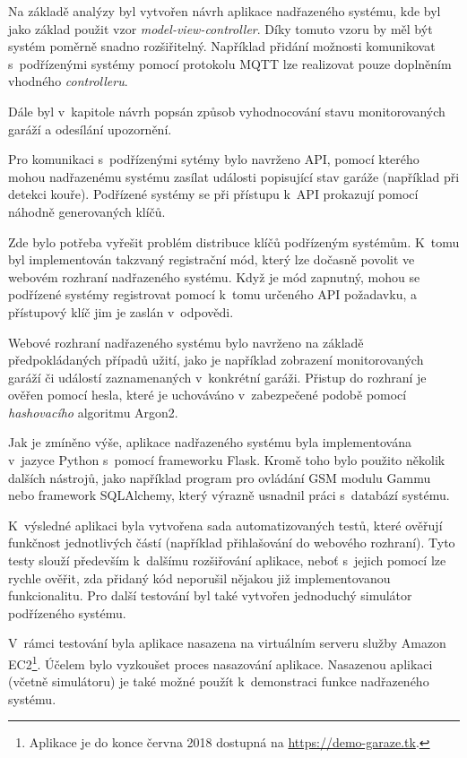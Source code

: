 Na základě analýzy byl vytvořen návrh aplikace nadřazeného systému, kde byl jako základ použit vzor \textit{model-view-controller}. Díky tomuto vzoru by měl být systém poměrně snadno rozšiřitelný. Například přidání možnosti komunikovat s~podřízenými systémy pomocí protokolu MQTT lze realizovat pouze doplněním vhodného \textit{controlleru}.

Dále byl v~kapitole návrh popsán způsob vyhodnocování stavu monitorovaných garáží a odesílání upozornění.

Pro komunikaci s~podřízenými sytémy bylo navrženo API, pomocí kterého mohou nadřazenému systému zasílat události popisující stav garáže (například při detekci kouře). Podřízené systémy se při přístupu k~API prokazují pomocí náhodně generovaných klíčů.

Zde bylo potřeba vyřešit problém distribuce klíčů podřízeným systémům. K~tomu byl implementován takzvaný registrační mód, který lze dočasně povolit ve webovém rozhraní nadřazeného systému. Když je mód zapnutný, mohou se podřízené systémy registrovat pomocí k~tomu určeného API požadavku, a přístupový klíč jim je zaslán v~odpovědi.

Webové rozhraní nadřazeného systému bylo navrženo na základě předpokládaných případů užití, jako je například zobrazení monitorovaných garáží či událostí zaznamenaných v~konkrétní garáži. Přistup do rozhraní je ověřen pomocí hesla, které je uchováváno v~zabezpečené podobě pomocí \textit{hashovacího} algoritmu Argon2.

Jak je zmíněno výše, aplikace nadřazeného systému byla implementována v~jazyce Python s~pomocí frameworku Flask. Kromě toho bylo použito několik dalších nástrojů, jako například program pro ovládání GSM modulu Gammu nebo framework SQLAlchemy, který výrazně usnadnil práci s~databází systému.


K~výsledné aplikaci byla vytvořena sada automatizovaných testů, které ověřují funkčnost jednotlivých částí (například přihlašování do webového rozhraní). Tyto testy slouží především k~dalšímu rozšiřování aplikace, neboť s~jejich pomocí lze rychle ověřit, zda přidaný kód neporušil nějakou již implementovanou funkcionalitu. Pro další testování byl také vytvořen jednoduchý simulátor podřízeného systému.

V~rámci testování byla aplikace nasazena na virtuálním serveru služby Amazon EC2\footnote{Aplikace je do konce června 2018 dostupná na \url{https://demo-garaze.tk}.}. Účelem bylo vyzkoušet proces nasazování aplikace. Nasazenou aplikaci (včetně simulátoru) je také možné použít k~demonstraci funkce nadřazeného systému.

